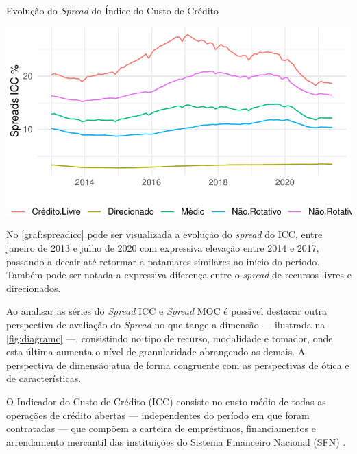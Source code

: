 \documentclass[
  12pt,
  12pt,
  openright,
  oneside,
  a4paper,
  chapter=TITLE,
  section=TITLE,
  subsection=TITLE,
  subsubsection=TITLE,
  portugues,
  sumario=tradicional]{abntex2}
\begin{document}
\begin{grafico}[!htbp]
\vspace{20pt}
\caption{Evolução do \emph{Spread} do Índice do Custo de Crédito}
\vspace{-4mm}

\begin{center}\includegraphics{12-exportedfigures/spread 2019 icc-1} \end{center}
\vspace{-3mm}
\label{graf:spreadicc}
\vspace{-2mm}
\end{grafico}

No \autoref{graf:spreadicc} pode ser visualizada a evolução do \emph{spread} do ICC, entre janeiro de 2013 e julho de 2020 com expressiva elevação entre 2014 e 2017, passando a decair até retormar a patamares similares ao início do período. Também pode ser notada a expressiva diferença entre o \emph{spread} de recursos livres e direcionados.

Ao analisar as séries do \emph{Spread} ICC e \emph{Spread} MOC é possível destacar outra perspectiva de avaliação do \emph{Spread} no que tange a dimensão --- ilustrada na \autoref{fig:diagramc} ---, consistindo no tipo de recurso, modalidade e tomador, onde esta última aumenta o nível de granularidade abrangendo as demais. A perspectiva de dimensão atua de forma congruente com as perspectivas de ótica e de características.

O Indicador do Custo de Crédito (ICC) consiste no custo médio de todas as operações de crédito abertas --- independentes do período em que foram contratadas --- que compõem a carteira de empréstimos, financiamentos e arrendamento mercantil das instituições do Sistema Financeiro Nacional (SFN) \cite{BCB:2000}.
\end{document}
